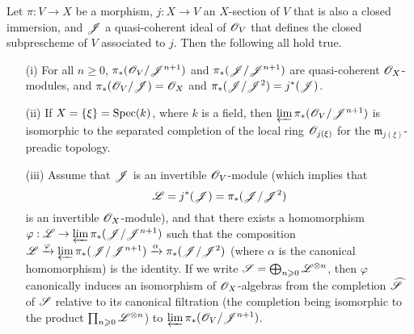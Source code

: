 \begin{lemma}[8.10.1]
\label{II.8.10.1}
Let $\pi:V\to X$ be a morphism, $j:X\to V$ an $X$-section of $V$ that is also a closed immersion, and $\mathscr{J}$ a quasi-coherent ideal of $\mathscr{O}_V$ that defines the closed subprescheme of $V$ associated to $j$.
Then the following all hold true.
\begin{enumerate}
  \item[\rm{(i)}] For all $n\geq0$, $\pi_*(\mathscr{O}_V/\mathscr{J}^{n+1})$ and $\pi_*(\mathscr{J}/\mathscr{J}^{n+1})$ are quasi-coherent $\mathscr{O}_X$-modules, and $\pi_*(\mathscr{O}_V/\mathscr{J})=\mathscr{O}_X$ and $\pi_*(\mathscr{J}/\mathscr{J}^2)=j^*(\mathscr{J})$.
  \item[\rm{(ii)}] If $X=\{\xi\}=\operatorname{Spec}(k)$, where $k$ is a field, then $\varprojlim\pi_*(\mathscr{O}_V/\mathscr{J}^{n+1})$ is isomorphic to the separated completion of the local ring $\mathscr{O}_{j(\xi)}$ for the $\mathfrak{m}_{j(\xi)}$-preadic topology.
  \item[\rm{(iii)}] Assume that $\mathscr{J}$ is an invertible $\mathscr{O}_V$-module (which implies that
    \[
      \mathscr{L} = j^*(\mathscr{J}) = \pi_*(\mathscr{J}/\mathscr{J}^2)
    \]
    is an invertible $\mathscr{O}_X$-module), and that there exists a homomorphism $\varphi:\sh{L}\to\varprojlim\pi_*(\sh{J}/\sh{J}^{n+1})$ such that the composition $\mathscr{L} \xrightarrow{\varphi} \varprojlim\pi_*(\mathscr{J}/\mathscr{J}^{n+1}) \xrightarrow{\alpha} \pi_*(\mathscr{J}/\mathscr{J}^2)$ (where $\alpha$ is the canonical homomorphism) is the identity.
    If we write $\mathscr{S}=\bigoplus_{n\geqslant0}\mathscr{L}^{\otimes n}$, then $\varphi$ canonically induces an isomorphism of $\mathscr{O}_X$-algebras from the completion $\widehat{\mathscr{S}}$ of $\mathscr{S}$ relative to its canonical filtration (the completion being isomorphic to the product $\prod_{n\geqslant0}\mathscr{L}^{\otimes n}$) to $\varprojlim\pi_*(\mathscr{O}_V/\mathscr{J}^{n+1})$.
\end{enumerate}
\end{lemma}

